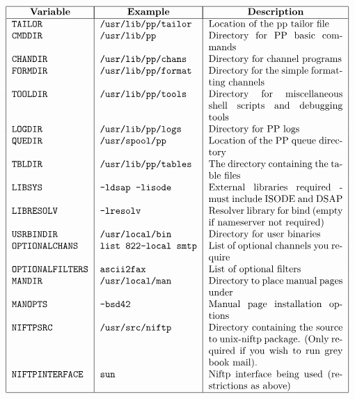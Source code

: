 \[\begin{tabular}{| l | l | p{0.4\textwidth}|}
\hline
	\multicolumn{1}{|c|}{\bf Variable} &
		\multicolumn{1}{|c|}{\bf Example} &
			\multicolumn{1}{|c|}{\bf Description} \\
\hline
	\tt TAILOR&	\tt /usr/lib/pp/tailor&
					Location of the pp tailor file\\
	\tt CMDDIR&	\tt /usr/lib/pp&Directory for PP basic commands\\
	\tt CHANDIR&	\tt /usr/lib/pp/chans&
					Directory for channel programs\\
	\tt FORMDIR&	\tt /usr/lib/pp/format&
					Directory for the simple
					formatting channels\\
	\tt TOOLDIR&	\tt /usr/lib/pp/tools&
					Directory for miscellaneous 
					shell scripts and debugging tools\\
	\tt LOGDIR&	\tt /usr/lib/pp/logs&	Directory for PP logs\\
	\tt QUEDIR&	\tt /usr/spool/pp&
					Location of the PP queue directory\\
	\tt TBLDIR&	\tt /usr/lib/pp/tables&
					The directory containing the
					table files\\
	\tt LIBSYS&	\tt -ldsap -lisode&	
					External libraries required - must
					include ISODE and DSAP\\
	\tt LIBRESOLV&	\tt -lresolv&	Resolver library for bind (empty
					if nameserver not required) \\
	\tt USRBINDIR&	\tt /usr/local/bin&
					Directory for user binaries\\
	\tt OPTIONALCHANS&\tt list 822-local smtp &
					List of optional channels you require \\
	\tt OPTIONALFILTERS&\tt ascii2fax &	List of optional filters\\
	\tt MANDIR&	\tt /usr/local/man&
					Directory to place manual
					pages under \\
	\tt MANOPTS&	\tt -bsd42&	Manual page installation
					options\\
	\tt NIFTPSRC&	\tt /usr/src/niftp&
					Directory containing the
source to unix-niftp package. (Only required if you wish to run grey
book mail). \\
	\tt NIFTPINTERFACE&\tt sun&	Niftp interface being used
(restrictions as above)\\
\hline
\end{tabular}\]
